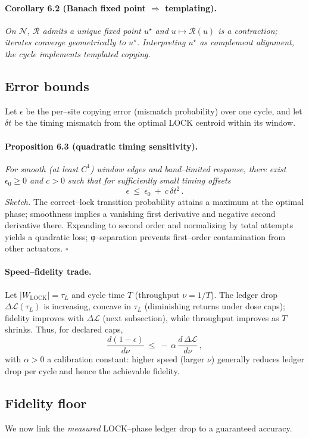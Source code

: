 \documentclass[11pt]{article}
\begin{document}
\paragraph{Corollary 6.2 (Banach fixed point $\Rightarrow$ templating).}
\emph{On $\mathcal{N}$, $\mathcal{R}$ admits a unique fixed point $u^\star$ and $u\mapsto \mathcal{R}(u)$ is a contraction; iterates converge geometrically to $u^\star$. Interpreting $u^\star$ as complement alignment, the cycle implements \emph{templated copying}.}

\subsection{Error bounds}\label{sec:errorbounds}
Let $\epsilon$ be the per–site copying error (mismatch probability) over one cycle, and let $\delta t$ be the timing mismatch from the optimal LOCK centroid within its window.

\paragraph{Proposition 6.3 (quadratic timing sensitivity).}
\emph{For smooth (at least $C^1$) window edges and band–limited response, there exist $\epsilon_0\ge 0$ and $c>0$ such that for sufficiently small timing offsets}
\[
\epsilon\ \le\ \epsilon_0\ +\ c\,\delta t^2\,.
\]
\emph{Sketch.} The correct–lock transition probability attains a maximum at the optimal phase; smoothness implies a vanishing first derivative and negative second derivative there. Expanding to second order and normalizing by total attempts yields a quadratic loss; φ–separation prevents first–order contamination from other actuators. \hfill$\square$

\paragraph{Speed–fidelity trade.}
Let $|W_{\mathrm{LOCK}}|=\tau_L$ and cycle time $T$ (throughput $\nu=1/T$). The ledger drop $\Delta\mathcal{L}(\tau_L)$ is increasing, concave in $\tau_L$ (diminishing returns under dose caps); fidelity improves with $\Delta\mathcal{L}$ (next subsection), while throughput improves as $T$ shrinks. Thus, for declared caps,
\[
\frac{d(1-\epsilon)}{d\nu}\ \le\ -\,\alpha\,\frac{d\,\Delta\mathcal{L}}{d\nu}\,,
\]
with $\alpha>0$ a calibration constant: higher speed (larger $\nu$) generally reduces ledger drop per cycle and hence the achievable fidelity.

\subsection{Fidelity floor}\label{sec:fidelityfloor}
We now link the \emph{measured} LOCK–phase ledger drop to a guaranteed accuracy.
\end{document}
